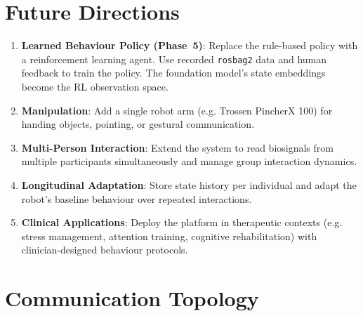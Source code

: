 \documentclass[11pt,a4paper]{article}
\begin{document}
\section{Future Directions}
\label{sec:future}

\begin{enumerate}[leftmargin=1.5em]
  \item \textbf{Learned Behaviour Policy (Phase~5)}: Replace the rule-based policy with a reinforcement learning agent. Use recorded \texttt{rosbag2} data and human feedback to train the policy. The foundation model's state embeddings become the RL observation space.

  \item \textbf{Manipulation}: Add a single robot arm (e.g. Trossen PincherX 100) for handing objects, pointing, or gestural communication.

  \item \textbf{Multi-Person Interaction}: Extend the system to read biosignals from multiple participants simultaneously and manage group interaction dynamics.

  \item \textbf{Longitudinal Adaptation}: Store state history per individual and adapt the robot's baseline behaviour over repeated interactions.

  \item \textbf{Clinical Applications}: Deploy the platform in therapeutic contexts (e.g. stress management, attention training, cognitive rehabilitation) with clinician-designed behaviour protocols.
\end{enumerate}


\appendix
\section{Communication Topology}
\label{app:topology}
\end{document}
